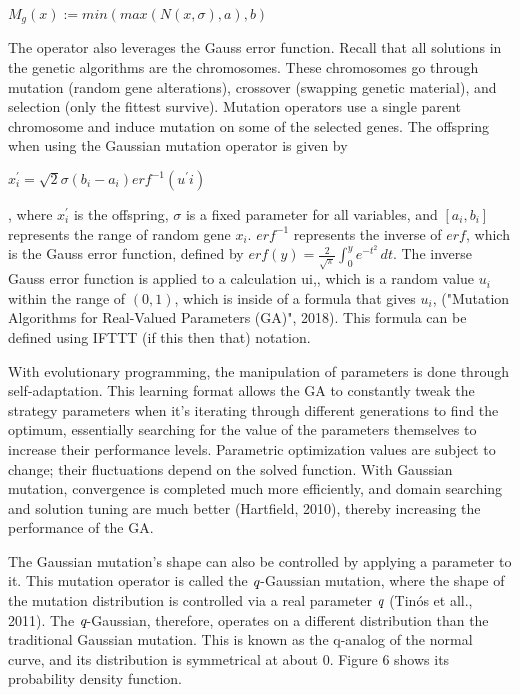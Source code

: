 \documentclass{JMLFS}
\begin{document}
\begin{center} $M_g(x) := min(max(N(x, \sigma),a),b)$ \end{center}

\noindent The operator also leverages the Gauss error function. Recall that all solutions in the genetic algorithms are the chromosomes. These chromosomes go through mutation (random gene alterations), crossover (swapping genetic material), and selection (only the fittest survive). Mutation operators use a single parent chromosome and induce mutation on some of the selected genes. The offspring when using the Gaussian mutation operator is given by

\begin{center} $x^{'}_{i} = \sqrt{2} \sigma (b_i - a_i)erf^{-1}(u^{'}i)$  \end{center}

\noindent , where  $x^{'}_{i}$ is the offspring, $\sigma$ is a fixed parameter for all variables, and $[a_i, b_i]$ represents the range of random gene $x_i$. $erf^{-1}$ represents the inverse of $erf$, which is the Gauss error function, defined by $erf(y) = \frac{2}{\sqrt{\pi}}\int_{0}^{y} e^{-t^{2}}\,dt$. The inverse Gauss error function is applied to a calculation ui,, which is a random value $u_i$  within the range of $(0,1)$, which is inside of a formula that gives $u_i$, ("Mutation Algorithms for Real-Valued Parameters (GA)", 2018). This formula can be defined using IFTTT (if this then that) notation.

With evolutionary programming, the manipulation of parameters is done through self-adaptation. This learning format allows the GA to constantly tweak the strategy parameters when it's iterating through different generations to find the optimum, essentially searching for the value of the parameters themselves to increase their performance levels. Parametric optimization values are subject to change; their fluctuations depend on the solved function. With Gaussian mutation, convergence is completed much more efficiently, and domain searching and solution tuning are much better (Hartfield, 2010), thereby increasing the performance of the GA.

The Gaussian mutation's shape can also be controlled by applying a parameter to it. This mutation operator is called the $\emph{q}$-Gaussian mutation, where the shape of the mutation distribution is controlled via a real parameter $\emph{q}$ (Tinós et all., 2011). The $\emph{q}$-Gaussian, therefore, operates on a different distribution than the traditional Gaussian mutation. This is known as the q-analog of the normal curve, and its distribution is symmetrical at about 0. Figure 6 shows its probability density function.
\end{document}
